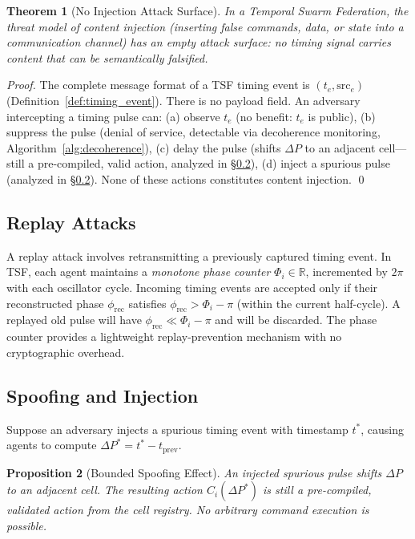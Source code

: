 \documentclass[twocolumn,10pt]{article}
\newtheorem{theorem}{Theorem}[section]
\newtheorem{proposition}[theorem]{Proposition}
\newcommand{\DeltaP}{\Delta P}
\begin{document}
\begin{theorem}[No Injection Attack Surface]
\label{thm:no_injection}
In a Temporal Swarm Federation, the threat model of content injection
(inserting false commands, data, or state into a communication channel) has
an empty attack surface: no timing signal carries content that can be
semantically falsified.
\end{theorem}

\begin{proof}
The complete message format of a TSF timing event is $(t_e, \mathrm{src}_e)$
(Definition~\ref{def:timing_event}). There is no payload field. An adversary
intercepting a timing pulse can:
(a) observe $t_e$ (no benefit: $t_e$ is public),
(b) suppress the pulse (denial of service, detectable via decoherence monitoring,
    Algorithm~\ref{alg:decoherence}),
(c) delay the pulse (shifts $\DeltaP$ to an adjacent cell---still a pre-compiled,
    valid action, analyzed in \S\ref{sec:spoof}),
(d) inject a spurious pulse (analyzed in \S\ref{sec:spoof}).
None of these actions constitutes content injection. \qed
\end{proof}

\subsection{Replay Attacks}

A replay attack involves retransmitting a previously captured timing event.
In TSF, each agent maintains a \emph{monotone phase counter}
$\Phi_i \in \mathbb{R}$, incremented by $2\pi$ with each oscillator cycle.
Incoming timing events are accepted only if their reconstructed phase
$\phi_{\mathrm{rec}}$ satisfies $\phi_{\mathrm{rec}} > \Phi_i - \pi$ (within
the current half-cycle). A replayed old pulse will have $\phi_{\mathrm{rec}}
\ll \Phi_i - \pi$ and will be discarded. The phase counter provides a
lightweight replay-prevention mechanism with no cryptographic overhead.

\subsection{Spoofing and Injection}
\label{sec:spoof}

Suppose an adversary injects a spurious timing event with timestamp $t^*$,
causing agents to compute $\DeltaP^* = t^* - t_{\mathrm{prev}}$.

\begin{proposition}[Bounded Spoofing Effect]
\label{prop:spoof}
An injected spurious pulse shifts $\DeltaP$ to an adjacent cell. The resulting
action $C_i(\DeltaP^*)$ is still a pre-compiled, validated action from the
cell registry. No arbitrary command execution is possible.
\end{proposition}
\end{document}
